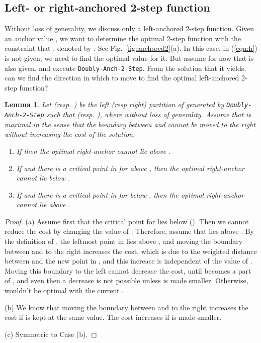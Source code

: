 \documentclass[preprint,10pt]{elsarticle}
\newtheorem{lemma}{Lemma}
\begin{document}
\subsection{Left- or right-anchored 2-step function}
Without loss of generality, we discuss only a left-anchored 2-step function. 
Given an anchor value ,
we want to determine the optimal 2-step function with the constraint
that , denoted by .
See Fig.~\ref{fig:anchored2}(a).
In this case,  in (\ref{eqn:h}) is not given; 
we need to find the optimal value for it.
But assume for now that  is also given,
and execute {\tt Doubly-Anch-2-Step}.
From the solution that it yields,
can we find the direction in which to move  to find the optimal
left-anchored 2-step function?
\begin{lemma}
Let  (resp. ) be the left (resp right) partition of  generated by {\tt Doubly-Anch-2-Step}
such that   (resp. ), where  without loss of generality.
Assume that  is maximal in the sense that the boundary between  and 
cannot be moved to the right without increasing the cost of the solution.
\begin{enumerate}
\item[(a)]
If  then the optimal right-anchor cannot lie above .
\item[(b)]
If  and there is a critical point in  for  above ,
then the optimal right-anchor cannot lie below .
\item[(c)]
If  and there is a critical point in  for  below ,
then the optimal right-anchor cannot lie above .
\end{enumerate}
\end{lemma}
\begin{proof}
(a) Assume first that the critical point  for  lies below  ().
Then we cannot reduce the cost by changing the value of .
Therefore, assume that  lies above .
By the definition of , the leftmost point in  lies above ,
and moving the boundary between  and  to the right increases the cost,
which is due to the weighted distance between  and the new point in ,
and this increase is independent of the value of .
Moving this boundary to the left cannot decrease the cost,
until  becomes a part of ,
and even then a decrease is not possible unless  is made smaller.
Otherwise,  wouldn't be optimal with the current .

(b) We know that moving the boundary between  and  to the right increases the cost
 if  is kept at the same value.
The cost increases if  is made smaller.

(c) Symmetric to Case (b).
\end{proof}
\end{document}
